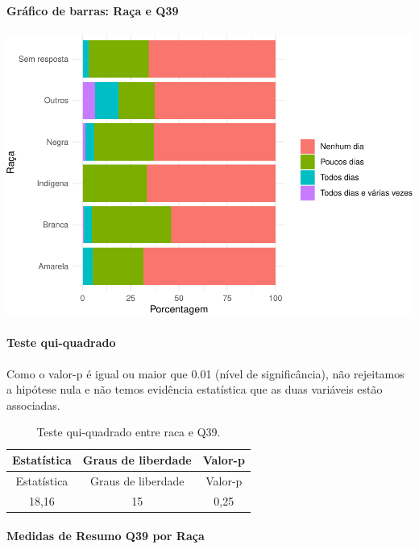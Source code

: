\documentclass[]{article}
\let\oldparagraph\paragraph
\renewcommand{\paragraph}[1]{\oldparagraph{#1}\mbox{}}
\begin{document}
\hypertarget{gruxe1fico-de-barras-rauxe7a-e-q39}{%
\paragraph{Gráfico de barras: Raça e Q39}\label{gruxe1fico-de-barras-rauxe7a-e-q39}}

\begin{center}\includegraphics[width=0.75\linewidth]{relatorio_covid19_files/figure-latex/unnamed-chunk-1519-1} \end{center}

\hypertarget{teste-qui-quadrado-130}{%
\paragraph{Teste qui-quadrado}\label{teste-qui-quadrado-130}}

Como o valor-p é igual ou maior que 0.01 (nível de significância), não rejeitamos a hipótese nula e não temos evidência estatística que as duas variáveis estão associadas.

\begin{longtable}[]{@{}ccc@{}}
\caption{\label{tab:unnamed-chunk-1521}Teste qui-quadrado entre raca e Q39.}\tabularnewline
\toprule
Estatística & Graus de liberdade & Valor-p\tabularnewline
\midrule
\endfirsthead
\toprule
Estatística & Graus de liberdade & Valor-p\tabularnewline
\midrule
\endhead
18,16 & 15 & 0,25\tabularnewline
\bottomrule
\end{longtable}

\cleardoublepage

\hypertarget{medidas-de-resumo-q39-por-rauxe7a}{%
\paragraph{Medidas de Resumo Q39 por Raça}\label{medidas-de-resumo-q39-por-rauxe7a}}
\end{document}
